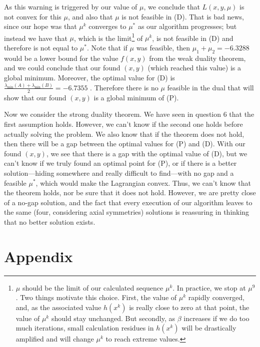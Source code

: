 \documentclass{article}
\begin{document}
As this warning is triggered by our value of $\mu$, we conclude that $L(x, y, \mu)$ is not convex for this $\mu$, and also that $\mu$ is not feasible in (D). That is bad news, since our hope was that $\mu^k$ converges to $\mu^*$ as our algorithm progresses; but instead we have that $\mu$, which is the limit\footnote{$\mu$ should be the limit of our calculated sequence $\mu^k$. In practice, we stop at $\mu^9$. Two things motivate this choice. First, the value of $\mu^k$ rapidly converged, and, as the associated value $h(x^k)$ is really close to zero at that point, the value of $\mu^k$ should stay unchanged. But secondly, as $\beta$ increases if we do too much iterations, small calculation residues in $h(x^k)$ will be drastically amplified and will change $\mu^k$ to reach extreme values.}
of $\mu^k$, is not feasible in (D) and therefore is not equal to $\mu^*$. Note that if $\mu$ was feasible, then $\mu_1 + \mu_2 = -6.3288$ would be a lower bound for the value $f(x, y)$ from the weak duality theorem, and we could conclude that our found $(x, y)$ (which reached this value) is a global minimum.
Moreover, the optimal value for (D) is $\frac{\lambda_{\min}(A) + \lambda_{\min}(B)}{2} = -6.7355$ . Therefore there is no $\mu$ feasible in the dual that will show that our found $(x, y)$ is a global minimum of (P).

Now we consider the strong duality theorem. We have seen in question 6 that the first assumption holds. However, we can't know if the second one holds before actually solving the problem. We also know that if the theorem does not hold, then there will be a gap between the optimal values for (P) and (D). With our found $(x, y)$, we see that there is a gap with the optimal value of (D), but we can't know if we truly found an optimal point for (P), or if there is a better solution---hiding somewhere and really difficult to find---with no gap and a feasible $\mu^*$, which would make the Lagrangian convex. Thus, we can't know that the theorem holds, nor be sure that it does not hold. However, we are pretty close of a no-gap solution, and the fact that every execution of our algorithm leaves to the same (four, considering axial symmetries) solutions is reassuring in thinking that no better solution exists.\\

\pagebreak

\section*{Appendix}
\end{document}
